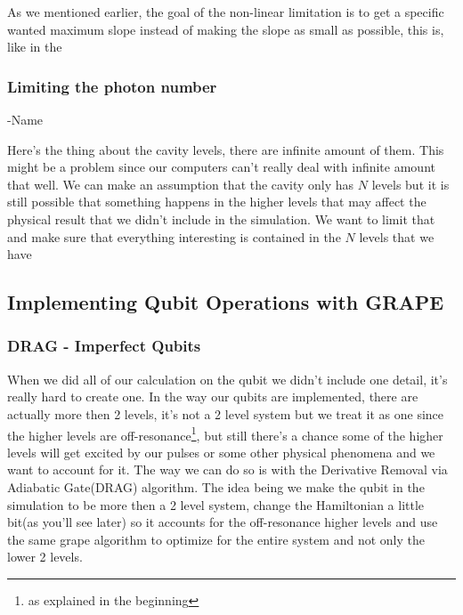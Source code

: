 \documentclass[english, a4paper, 12pt, twoside]{article}
\numberwithin{equation}{section} %
\begin{document}
As we mentioned earlier, the goal of the non-linear limitation is to get a specific wanted maximum slope instead of making the slope as small as possible, this is, like in the 

\subsubsection{Limiting the photon number} 
\centerline{}
\centerline{-Name} %
Here's the thing about the cavity levels, there are infinite amount of them. This might be a problem since our computers can't really deal with infinite amount that well. We can make an assumption that the cavity only has \(N\) levels but it is still possible that something happens in the higher levels that may affect the physical result that we didn't include in the simulation. We want to limit that and make sure that everything interesting is contained in the \(N\) levels that we have


\subsection{Implementing Qubit Operations with GRAPE}

\subsubsection{DRAG - Imperfect Qubits}
When we did all of our calculation on the qubit we didn't include one detail, it's really hard to create one. In the way our qubits are implemented, there are actually more then 2 levels, it's not a 2 level system but we treat it as one since the higher levels are off-resonance\footnote{as explained in the beginning}, but still there's a chance some of the higher levels will get excited by our pulses or some other physical phenomena and we want to account for it. The way we can do so is with the Derivative Removal via Adiabatic Gate(DRAG) algorithm. The idea being we make the qubit in the simulation to be more then a 2 level system, change the Hamiltonian a little bit(as you'll see later) so it accounts for the off-resonance higher levels and use the same grape algorithm to optimize for the entire system and not only the lower 2 levels.
\end{document}
